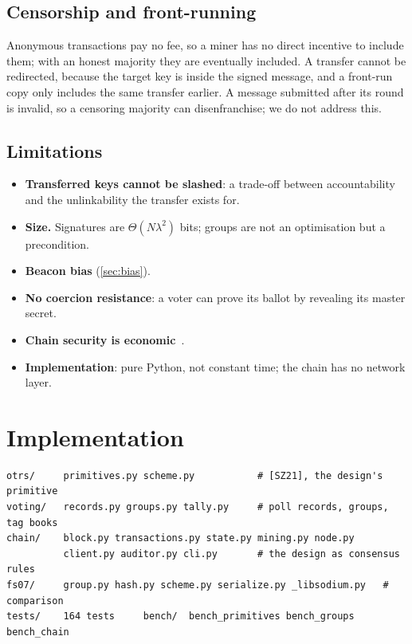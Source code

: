 \documentclass[11pt,a4paper]{article}
\theoremstyle{definition}
\begin{document}
\subsection{Censorship and front-running}

Anonymous transactions pay no fee, so a miner has no direct incentive to
include them; with an honest majority they are eventually included. A
transfer cannot be redirected, because the target key is inside the
signed message, and a front-run copy only includes the same transfer
earlier. A message submitted after its round is invalid, so a censoring
majority can disenfranchise; we do not address this.

\subsection{Limitations}
\label{sec:limits}

\begin{itemize}[leftmargin=*]
\item \textbf{Transferred keys cannot be slashed}: a trade-off between
      accountability and the unlinkability the transfer exists for.
\item \textbf{Size.} Signatures are $\Theta(N\lambda^2)$ bits; groups are
      not an optimisation but a precondition.
\item \textbf{Beacon bias} (\cref{sec:bias}).
\item \textbf{No coercion resistance}: a voter can prove its ballot by
      revealing its master secret.
\item \textbf{Chain security is economic}~\cite{ParkSpecter2021}.
\item \textbf{Implementation}: pure Python, not constant time; the chain
      has no network layer.
\end{itemize}

\section{Implementation}
\label{sec:impl}

\begin{lstlisting}[style=shell]
otrs/     primitives.py scheme.py           # [SZ21], the design's primitive
voting/   records.py groups.py tally.py     # poll records, groups, tag books
chain/    block.py transactions.py state.py mining.py node.py
          client.py auditor.py cli.py       # the design as consensus rules
fs07/     group.py hash.py scheme.py serialize.py _libsodium.py   # comparison
tests/    164 tests     bench/  bench_primitives bench_groups bench_chain
\end{lstlisting}
\end{document}
